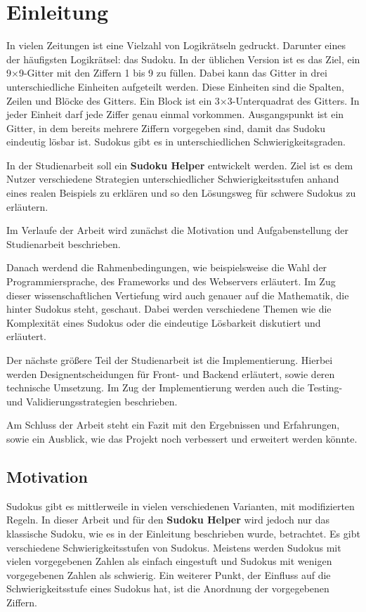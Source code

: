 
\chapter{Einleitung}
In vielen Zeitungen ist eine Vielzahl von Logikrätseln gedruckt. Darunter eines der häufigsten Logikrätsel: das Sudoku.
In der üblichen Version ist es das Ziel, ein 9×9-Gitter mit den Ziffern 1 bis 9 zu füllen. Dabei kann das Gitter in drei unterschiedliche Einheiten aufgeteilt werden. Diese Einheiten sind die Spalten, Zeilen und Blöcke des Gitters. Ein Block ist ein 3×3-Unterquadrat des Gitters. In jeder Einheit darf jede Ziffer genau einmal vorkommen.
Ausgangspunkt ist ein Gitter, in dem bereits mehrere Ziffern vorgegeben sind, damit das Sudoku eindeutig lösbar ist. Sudokus gibt es in unterschiedlichen Schwierigkeitsgraden. 

In der Studienarbeit soll ein \textbf{Sudoku Helper} entwickelt werden. Ziel ist es dem Nutzer verschiedene Strategien unterschiedlicher Schwierigkeitsstufen anhand eines realen Beispiels zu erklären und so den Lösungsweg für schwere Sudokus zu erläutern. \cite{FAZ} \cite{sudopedia_2022}

Im Verlaufe der Arbeit wird zunächst die Motivation und Aufgabenstellung der Studienarbeit beschrieben. 

Danach werdend die Rahmenbedingungen, wie beispielsweise die Wahl der Programmiersprache, des Frameworks und des Webservers erläutert. Im Zug dieser wissenschaftlichen Vertiefung wird auch genauer auf die Mathematik, die hinter Sudokus steht, geschaut. Dabei werden verschiedene Themen wie die Komplexität eines Sudokus oder die eindeutige Lösbarkeit diskutiert und erläutert.

Der nächste größere Teil der Studienarbeit ist die Implementierung. Hierbei werden Designentscheidungen für Front- und Backend erläutert, sowie deren technische Umsetzung. Im Zug der Implementierung werden auch die Testing- und Validierungsstrategien beschrieben.

Am Schluss der Arbeit steht ein Fazit mit den Ergebnissen und Erfahrungen, sowie ein Ausblick, wie das Projekt noch verbessert und erweitert werden könnte.
 

\section{Motivation}
Sudokus gibt es mittlerweile in vielen verschiedenen Varianten, mit modifizierten Regeln. In dieser Arbeit und für den \textbf{Sudoku Helper} wird jedoch nur das klassische Sudoku, wie es in der Einleitung beschrieben wurde, betrachtet. Es gibt verschiedene Schwierigkeitsstufen von Sudokus. Meistens werden Sudokus mit vielen vorgegebenen Zahlen als einfach eingestuft und Sudokus mit wenigen vorgegebenen Zahlen als schwierig. Ein weiterer Punkt, der Einfluss auf die Schwierigkeitsstufe eines Sudokus hat, ist die Anordnung der vorgegebenen Ziffern.

